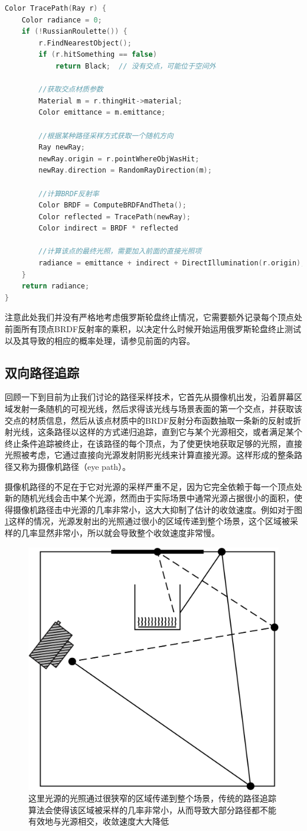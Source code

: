 \begin{lstlisting}[language=C++]
Color TracePath(Ray r) {
	Color radiance = 0;
	if (!RussianRoulette()) {
    	r.FindNearestObject();
    	if (r.hitSomething == false) 
      		return Black;  // 没有交点，可能位于空间外

		//获取交点材质参数
    	Material m = r.thingHit->material;
    	Color emittance = m.emittance;

    	//根据某种路径采样方式获取一个随机方向
    	Ray newRay;
    	newRay.origin = r.pointWhereObjWasHit;
    	newRay.direction = RandomRayDirection(m);

    	//计算BRDF反射率
    	Color BRDF = ComputeBRDFAndTheta();
    	Color reflected = TracePath(newRay);
    	Color indirect = BRDF * reflected

    	//计算该点的最终光照，需要加入前面的直接光照项
    	radiance = emittance + indirect + DirectIllumination(r.origin);
    }
	return radiance;
}
\end{lstlisting}

注意此处我们并没有严格地考虑俄罗斯轮盘终止情况，它需要额外记录每个顶点处前面所有顶点BRDF反射率的乘积，以决定什么时候开始运用俄罗斯轮盘终止测试以及其导致的相应的概率处理，请参见前面的内容。







\subsection{双向路径追踪}\label{sec:bidirectional-path-tracing}
回顾一下到目前为止我们讨论的路径采样技术，它首先从摄像机出发，沿着屏幕区域发射一条随机的可视光线，然后求得该光线与场景表面的第一个交点，并获取该交点的材质信息，然后从该点材质中的BRDF反射分布函数抽取一条新的反射或折射光线，这条路径以这样的方式递归追踪，直到它与某个光源相交，或者满足某个终止条件追踪被终止，在该路径的每个顶点，为了使更快地获取足够的光照，直接光照被考虑，它通过直接向光源发射阴影光线来计算直接光源。这样形成的整条路径又称为摄像机路径（eye path）。

摄像机路径的不足在于它对光源的采样严重不足，因为它完全依赖于每一个顶点处新的随机光线会击中某个光源，然而由于实际场景中通常光源占据很小的面积，使得摄像机路径击中光源的几率非常小，这大大抑制了估计的收敛速度。例如对于图\ref{f:pt-bid-tracing}这样的情况，光源发射出的光照通过很小的区域传递到整个场景，这个区域被采样的几率显然非常小，所以就会导致整个收敛速度非常慢。

\begin{figure}
\sidecaption
	\includegraphics[width=.3\textwidth]{figures/pt/path-9}
	\caption{这里光源的光照通过很狭窄的区域传递到整个场景，传统的路径追踪算法会使得该区域被采样的几率非常小，从而导致大部分路径都不能有效地与光源相交，收敛速度大大降低}
	\label{f:pt-bid-tracing}
\end{figure}

